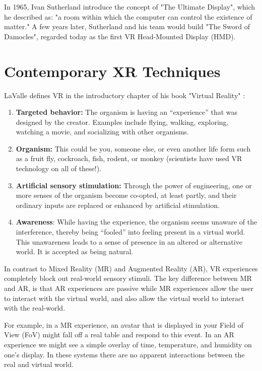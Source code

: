 In 1965, Ivan Sutherland introduce the concept of "The Ultimate Display", which he described as: "a room within which the computer can control the existence of matter." \cite{sutherland1965ultimate} A few years later, Sutherland and his team would build "The Sword of Damocles", regarded today as the first VR Head-Mounted Display (HMD).




\section{Contemporary XR Techniques}

LaValle defines VR in the introductory chapter of his book "Virtual Reality" \cite{lavalle2016virtual}: 

\begin{enumerate}
    \item \textbf{Targeted behavior:} The organism is having an “experience” that was designed by the creator. Examples include flying, walking, exploring, watching a movie, and socializing with other organisms.
    \item \textbf{Organism:} This could be you, someone else, or even another life form such as a fruit fly, cockroach, fish, rodent, or monkey (scientists have used VR technology on all of these!).
    \item \textbf{Artificial sensory stimulation:} Through the power of engineering, one or more senses of the organism become co-opted, at least partly, and their ordinary inputs are replaced or enhanced by artificial stimulation.
    \item \textbf{Awareness}: While having the experience, the organism seems unaware of the interference, thereby being “fooled” into feeling present in a virtual world. This unawareness leads to a sense of presence in an altered or alternative world. It is accepted as being natural.
\end{enumerate}

In contrast to Mixed Reality (MR) and Augmented Reality (AR), VR experiences completely block out real-world sensory stimuli. The key difference between MR and AR, is that AR experiences are passive while MR experiences allow the user to interact with the virtual world, and also allow the virtual world to interact with the real-world. 

For example, in a MR experience, an avatar that is displayed in your Field of View (FoV) might fall off a real table and respond to this event. In an AR experience we might see a simple overlay of time, temperature, and humidity on one's display. In these systems there are no apparent interactions between the real and virtual world. 

